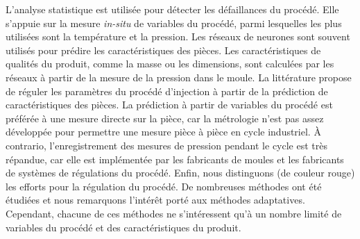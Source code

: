 L'analyse statistique est utilisée pour détecter les défaillances du procédé.
Elle s’appuie sur la mesure \textit{in-situ} de variables du procédé, parmi lesquelles les plus utilisées sont la température et la pression.
Les réseaux de neurones sont souvent utilisés pour prédire les caractéristiques des pièces.
Les caractéristiques de qualités du produit, comme la masse ou les dimensions, sont calculées par les réseaux à partir de la mesure de la pression dans le moule.
La littérature propose de réguler les paramètres du procédé d’injection à partir de la prédiction de caractéristiques des pièces.
La prédiction à partir de variables du procédé est préférée à une mesure directe sur la pièce, car la métrologie n’est pas assez développée pour permettre une mesure pièce à pièce en cycle industriel.
À contrario, l'enregistrement des mesures de pression pendant le cycle est très répandue, car elle est implémentée par les fabricants de moules et les fabricants de systèmes de régulations du procédé.
Enfin, nous distinguons (de couleur rouge) les efforts pour la régulation du procédé.
De nombreuses méthodes ont été étudiées et nous remarquons l’intérêt porté aux méthodes adaptatives.
Cependant, chacune de ces méthodes ne s’intéressent qu’à un nombre limité de variables du procédé et des caractéristiques du produit.

